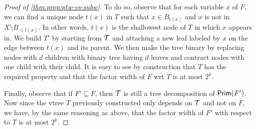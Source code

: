 \documentclass[a4paper,UKenglish,cleveref, autoref, thm-restate]{lipics-v2021}
\begin{document}
\begin{toappendix}
\begin{proof}[Proof of \cref{thm:prop:ptw-vs-subw}]
      To do so, observe that for each variable $x$ of $F$, we can find a unique node $t(x)$ in $T$ such that $x \in B_{t(x)}$ and $x$ is not in $X \setminus B_{\leq t(x)}$. In other words, $t(x)$ is the shallowest node of $T$ in which $x$ appears in. We build $T'$ by starting from $\mathcal{T}$ and attaching a new leaf labeled by $x$ on the edge between $t(x)$ and its parent. We then make the tree binary by replacing nodes with $d$ children with binary tree having $d$ leaves and contract nodes with one child with their child. It is easy to see by construction that $T$ has the required property and that the factor width of $F$ wrt $T$ is at most $2^k$.

      Finally, observe that if $F' \subseteq F$, then $\mathcal{T}$ is still a tree decomposition of $\gprim[F']$. Now since the vtree $T$ previously constructed only depends on $\mathcal{T}$ and not on $F$, we have, by the same reasoning as above, that the factor width of $F'$ with respect to $T$ is at most $2^k$. 
\end{proof}
\end{toappendix}
\end{document}
